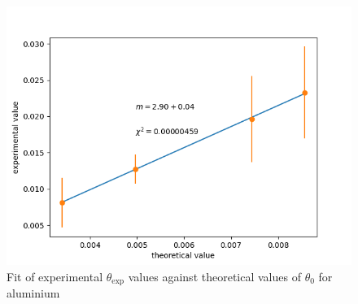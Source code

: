 \documentclass[t,9pt]{beamer}
\begin{document}
        \begin{frame}
                \vfill
                \begin{figure}
                        \centering
                        \includegraphics[width=.8\textwidth]{../src/elsa/finished_plots/Aluminium.png}
                        \caption{Fit of experimental $\theta_{\text{exp}}$ values against theoretical values of $\theta_{0}$ for aluminium}
                \end{figure}
        \end{frame}
\end{document}
